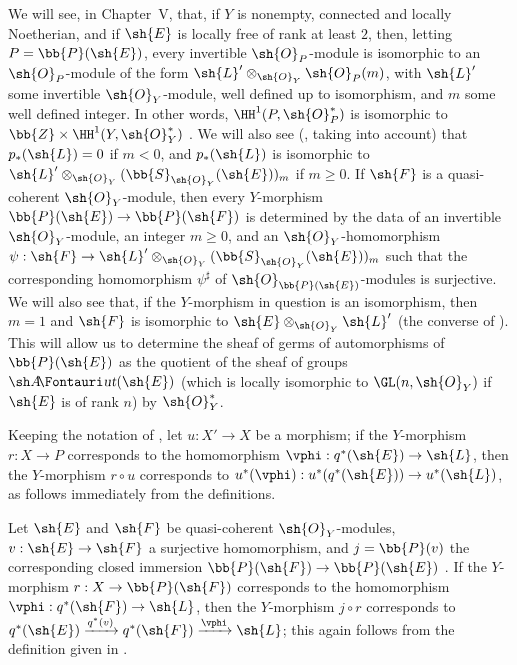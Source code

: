 \begin{remark}[4.2.7]
\label{II.4.2.7}
We will see, in Chapter~V, that, if $Y$ is nonempty, connected and locally Noetherian, and if $\sh{E}$ is locally free of rank at least $2$, then, letting $P=\bb{P}(\sh{E})$, every invertible $\sh{O}_P$-module is isomorphic to an $\sh{O}_P$-module of the form $\sh{L}'\otimes_{\sh{O}_Y}\sh{O}_P(m)$, with $\sh{L}'$ some invertible $\sh{O}_Y$-module, well defined up to isomorphism, and $m$ some well defined integer.
In other words, $\HH^1(P,\sh{O}_P^*)$ is isomorphic to $\bb{Z}\times\HH^1(Y,\sh{O}_Y^*)$ .
We will also see (, taking  into account) that $p_*(\sh{L})=0$ if $m<0$, and $p_*(\sh{L})$ is isomorphic to $\sh{L}'\otimes_{\sh{O}_Y}(\bb{S}_{\sh{O}_Y}(\sh{E}))_m$ if $m\geq0$.
If $\sh{F}$ is a quasi-coherent $\sh{O}_Y$-module, then every $Y$-morphism $\bb{P}(\sh{E})\to\bb{P}(\sh{F})$ is determined by the data of an invertible $\sh{O}_Y$-module, an integer $m\geq0$, and an $\sh{O}_Y$-homomorphism $\psi:\sh{F}\to\sh{L}'\otimes_{\sh{O}_Y}(\bb{S}_{\sh{O}_Y}(\sh{E}))_m$ such that the corresponding homomorphism $\psi^\sharp$ of $\sh{O}_{\bb{P}(\sh{E})}$-modules is surjective.
We will also see that, if the $Y$-morphism in question is an isomorphism, then $m=1$ and $\sh{F}$ is isomorphic to $\sh{E}\otimes_{\sh{O}_Y}\sh{L}'$ (the converse of ).
This will allow us to determine the sheaf of germs of automorphisms of $\bb{P}(\sh{E})$ as the quotient of the sheaf of groups $\shAut(\sh{E})$ (which is locally isomorphic to $\GL(n,\sh{O}_Y)$ if $\sh{E}$ is of rank $n$) by $\sh{O}_Y^*$.
\end{remark}

\begin{env}[4.2.8]
\label{II.4.2.8}
Keeping the notation of , let $u:X'\to X$ be a morphism;
if the $Y$-morphism $r:X\to P$ corresponds to the homomorphism $\vphi:q^*(\sh{E})\to\sh{L}$, then the $Y$-morphism $r\circ u$ corresponds to $u^*(\vphi):u^*(q^*(\sh{E}))\to u^*(\sh{L})$, as follows immediately from the definitions.
\end{env}

\begin{env}[4.2.9]
\label{II.4.2.9}
Let $\sh{E}$ and $\sh{F}$ be quasi-coherent $\sh{O}_Y$-modules, $v:\sh{E}\to\sh{F}$ a surjective homomorphism, and $j=\bb{P}(v)$ the corresponding closed immersion $\bb{P}(\sh{F})\to\bb{P}(\sh{E})$ .
If the $Y$-morphism $r:X\to\bb{P}(\sh{F})$ corresponds to the homomorphism $\vphi:q^*(\sh{F})\to\sh{L}$, then the
$Y$-morphism $j\circ r$ corresponds to $q^*(\sh{E})\xrightarrow{q^*(v)}q^*(\sh{F})\xrightarrow{\vphi}\sh{L}$;
this again follows from the definition given in .
\end{env}

